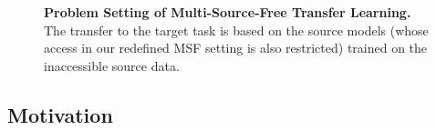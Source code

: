 \documentclass[letterpaper]{article} %
\begin{document}
\begin{figure}[ht]
    \centering
    \centerline{}
    \caption{\textbf{Problem Setting of Multi-Source-Free Transfer Learning.} The transfer to the target task is based on the source models (whose access in our redefined MSF setting is also restricted) trained on the inaccessible source data. }
    \label{fig:setup}
\end{figure}


\subsection{Motivation}
\end{document}
